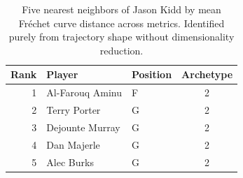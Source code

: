 \begin{table}[htbp]
  \centering\small
  \begin{tabular}{rllc}
    \toprule
    Rank & Player & Position & Archetype \\
    \midrule
    1 & Al-Farouq Aminu & F & 2 \\
    2 & Terry Porter & G & 2 \\
    3 & Dejounte Murray & G & 2 \\
    4 & Dan Majerle & G & 2 \\
    5 & Alec Burks & G & 2 \\
    \bottomrule
  \end{tabular}
  \caption{Five nearest neighbors of Jason Kidd by mean Fr\'{e}chet curve distance across metrics. Identified purely from trajectory shape without dimensionality reduction.}
  \label{tab:Jason_Kidd_frechet_curve_neighbors}
\end{table}

